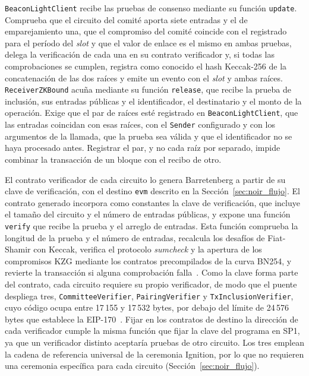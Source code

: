 \texttt{BeaconLightClient} recibe las pruebas de consenso mediante su función
\lstinline|update|. Comprueba que el circuito del comité aporta siete entradas y el de
emparejamiento una, que el compromiso del comité coincide con el registrado para el período del
\textit{slot} y que el valor de enlace es el mismo en ambas pruebas, delega la verificación de cada
una en su contrato verificador y, si todas las comprobaciones se cumplen, registra como conocido
el hash Keccak-256 de la concatenación de las dos raíces y emite un evento con el \textit{slot} y
ambas raíces. \texttt{ReceiverZKBound} acuña mediante su función \lstinline|release|, que recibe
la prueba de inclusión, sus entradas públicas y el identificador, el destinatario y el monto de la
operación. Exige que el par de raíces esté registrado en \texttt{BeaconLightClient}, que las
entradas coincidan con esas raíces, con el \texttt{Sender} configurado y con los argumentos de la
llamada, que la prueba sea válida y que el identificador no se haya procesado antes. Registrar el
par, y no cada raíz por separado, impide combinar la transacción de un bloque con el recibo de
otro.

El contrato verificador de cada circuito lo genera Barretenberg a partir de su clave de
verificación, con el destino \lstinline|evm| descrito en la Sección~\ref{sec:noir_flujo}. El
contrato generado incorpora como constantes la clave de verificación, que incluye el tamaño del
circuito y el número de entradas públicas, y expone una función \lstinline|verify| que recibe la
prueba y el arreglo de entradas. Esta función comprueba la longitud de la prueba y el número de
entradas, recalcula los desafíos de Fiat-Shamir con Keccak, verifica el protocolo
\textit{sumcheck} y la apertura de los compromisos KZG mediante los contratos precompilados de la
curva BN254, y revierte la transacción si alguna comprobación falla~\cite{barretenbergsrc}. Como
la clave forma parte del contrato, cada circuito requiere su propio verificador, de modo que el
puente despliega tres, \texttt{CommitteeVerifier}, \texttt{PairingVerifier} y
\texttt{TxInclusionVerifier}, cuyo código ocupa entre 17\,155 y 17\,532 bytes, por debajo del
límite de 24\,576 bytes que establece la EIP-170~\cite{eip170}. Fijar en los contratos de destino
la dirección de cada verificador cumple la misma función que fijar la clave del programa en SP1,
ya que un verificador distinto aceptaría pruebas de otro circuito. Los tres emplean la cadena de
referencia universal de la ceremonia Ignition, por lo que no requieren una ceremonia específica
para cada circuito (Sección~\ref{sec:noir_flujo}).

